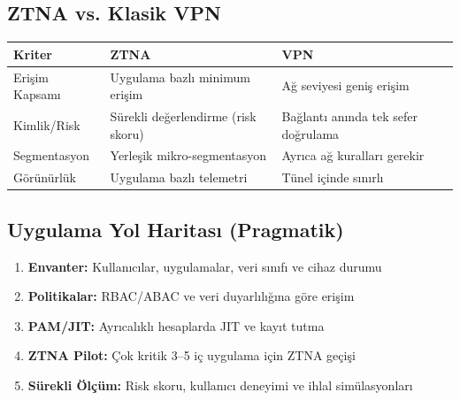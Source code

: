 \subsection{ZTNA vs. Klasik VPN}
\begin{center}
\begin{tabularx}{\textwidth}{|p{3.2cm}|X|X|}
\hline
\rowcolor{tableheadcolor}
\textbf{Kriter} & \textbf{ZTNA} & \textbf{VPN} \\
\hline
Erişim Kapsamı & Uygulama bazlı minimum erişim & Ağ seviyesi geniş erişim \\
\hline
Kimlik/Risk & Sürekli değerlendirme (risk skoru) & Bağlantı anında tek sefer doğrulama \\
\hline
Segmentasyon & Yerleşik mikro-segmentasyon & Ayrıca ağ kuralları gerekir \\
\hline
Görünürlük & Uygulama bazlı telemetri & Tünel içinde sınırlı \\
\hline
\end{tabularx}
\end{center}

\subsection{Uygulama Yol Haritası (Pragmatik)}
\begin{enumerate}
  \item \textbf{Envanter:} Kullanıcılar, uygulamalar, veri sınıfı ve cihaz durumu
  \item \textbf{Politikalar:} RBAC/ABAC ve veri duyarlılığına göre erişim
  \item \textbf{PAM/JIT:} Ayrıcalıklı hesaplarda JIT ve kayıt tutma
  \item \textbf{ZTNA Pilot:} Çok kritik 3–5 iç uygulama için ZTNA geçişi
  \item \textbf{Sürekli Ölçüm:} Risk skoru, kullanıcı deneyimi ve ihlal simülasyonları
\end{enumerate}




